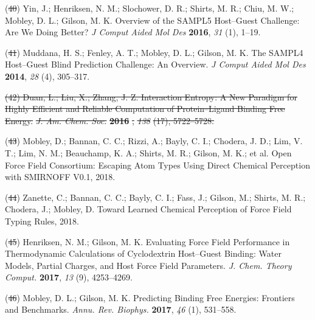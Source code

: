\documentclass[11pt,notitlepage]{article}
\providecommand{\DIFaddtex}[1]{{\protect\color{blue}\uwave{#1}}} %
\providecommand{\DIFdeltex}[1]{{\protect\color{red}\sout{#1}}}                      %
\providecommand{\DIFaddbegin}{} %
\providecommand{\DIFaddend}{} %
\providecommand{\DIFdelbegin}{} %
\providecommand{\DIFdelend}{} %
\providecommand{\DIFadd}[1]{\texorpdfstring{\DIFaddtex{#1}}{#1}} %
\providecommand{\DIFdel}[1]{\texorpdfstring{\DIFdeltex{#1}}{}} %
\newcommand{\DIFscaledelfig}{0.5}
\newlength{\DIFdelgraphicswidth} %
\newlength{\DIFdelgraphicsheight} %
\newcommand{\DIFaddincludegraphics}[2][]{{\color{blue}\fbox{\DIFOincludegraphics[#1]{#2}}}} %
\newcommand{\DIFdelincludegraphics}[2][]{%
\sbox{\DIFdelgraphicsbox}{\DIFOincludegraphics[#1]{#2}}%
\settoboxwidth{\DIFdelgraphicswidth}{\DIFdelgraphicsbox} %
\settoboxtotalheight{\DIFdelgraphicsheight}{\DIFdelgraphicsbox} %
\scalebox{\DIFscaledelfig}{%
\parbox[b]{\DIFdelgraphicswidth}{\usebox{\DIFdelgraphicsbox}\\[-\baselineskip] \rule{\DIFdelgraphicswidth}{0em}}\llap{\resizebox{\DIFdelgraphicswidth}{\DIFdelgraphicsheight}{%
\setlength{\unitlength}{\DIFdelgraphicswidth}%
\begin{picture}(1,1)%
\thicklines\linethickness{2pt} %
{\color[rgb]{1,0,0}\put(0,0){\framebox(1,1){}}}%
{\color[rgb]{1,0,0}\put(0,0){\line( 1,1){1}}}%
{\color[rgb]{1,0,0}\put(0,1){\line(1,-1){1}}}%
\end{picture}%
}\hspace*{3pt}}} %
} %
\DeclareRobustCommand{\DIFaddbegin}{\DIFOaddbegin \let\includegraphics\DIFaddincludegraphics} %
\DeclareRobustCommand{\DIFaddend}{\DIFOaddend \let\includegraphics\DIFOincludegraphics} %
\DeclareRobustCommand{\DIFdelbegin}{\DIFOdelbegin \let\includegraphics\DIFdelincludegraphics} %
\DeclareRobustCommand{\DIFdelend}{\DIFOaddend \let\includegraphics\DIFOincludegraphics} %
\begin{document}
\DIFdelend \hypertarget{ref-BGsUYQln}{}%
(\DIFdelbegin \DIFdel{40}\DIFdelend \DIFaddbegin \DIFadd{36}\DIFaddend ) Yin, J.; Henriksen, N. M.; Slochower, D. R.; Shirts, M. R.; Chiu,
M. W.; Mobley, D. L.; Gilson, M. K. Overview of the SAMPL5 Host--Guest
Challenge: Are We Doing Better? \emph{J Comput Aided Mol Des}
\textbf{2016}, \emph{31} (1), 1--19.

\leavevmode\hypertarget{ref-GA1AFcUw}{}%
(\DIFdelbegin \DIFdel{41}\DIFdelend \DIFaddbegin \DIFadd{37}\DIFaddend ) Muddana, H. S.; Fenley, A. T.; Mobley, D. L.; Gilson, M. K. The
SAMPL4 Host--Guest Blind Prediction Challenge: An Overview. \emph{J
Comput Aided Mol Des} \textbf{2014}, \emph{28} (4), 305--317.

\leavevmode\DIFdelbegin %
\DIFdel{(42) Duan, L.; Liu, X.; Zhang, J. Z. Interaction Entropy: A New Paradigm
for Highly Efficient and Reliable Computation of Protein--Ligand Binding
Free Energy. }\emph{\DIFdel{J. Am. Chem. Soc.}} %
\textbf{\DIFdel{2016}}%
\DIFdel{, }\emph{\DIFdel{138}} %
\DIFdel{(17),
5722--5728.
}%

\DIFdelend \hypertarget{ref-HlBr7NrU}{}%
(\DIFdelbegin \DIFdel{43}\DIFdelend \DIFaddbegin \DIFadd{38}\DIFaddend ) Mobley, D.; Bannan, C. C.; Rizzi, A.; Bayly, C. I.; Chodera, J. D.;
Lim, V. T.; Lim, N. M.; Beauchamp, K. A.; Shirts, M. R.; Gilson, M. K.;
et al. Open Force Field Consortium: Escaping Atom Types Using Direct
Chemical Perception with SMIRNOFF V0.1, 2018.

\leavevmode\hypertarget{ref-13lTSBgHy}{}%
(\DIFdelbegin \DIFdel{44}\DIFdelend \DIFaddbegin \DIFadd{39}\DIFaddend ) Zanette, C.; Bannan, C. C.; Bayly, C. I.; Fass, J.; Gilson, M.;
Shirts, M. R.; Chodera, J.; Mobley, D. Toward Learned Chemical
Perception of Force Field Typing Rules, 2018.

\leavevmode\hypertarget{ref-HVgz5rZq}{}%
(\DIFdelbegin \DIFdel{45}\DIFdelend \DIFaddbegin \DIFadd{40}\DIFaddend ) Henriksen, N. M.; Gilson, M. K. Evaluating Force Field Performance
in Thermodynamic Calculations of Cyclodextrin Host--Guest Binding: Water
Models, Partial Charges, and Host Force Field Parameters. \emph{J. Chem.
Theory Comput.} \textbf{2017}, \emph{13} (9), 4253--4269.

\leavevmode\hypertarget{ref-12BD3oHp4}{}%
(\DIFdelbegin \DIFdel{46}\DIFdelend \DIFaddbegin \DIFadd{41}\DIFaddend ) Mobley, D. L.; Gilson, M. K. Predicting Binding Free Energies:
Frontiers and Benchmarks. \emph{Annu. Rev. Biophys.} \textbf{2017},
\emph{46} (1), 531--558.
\end{document}
